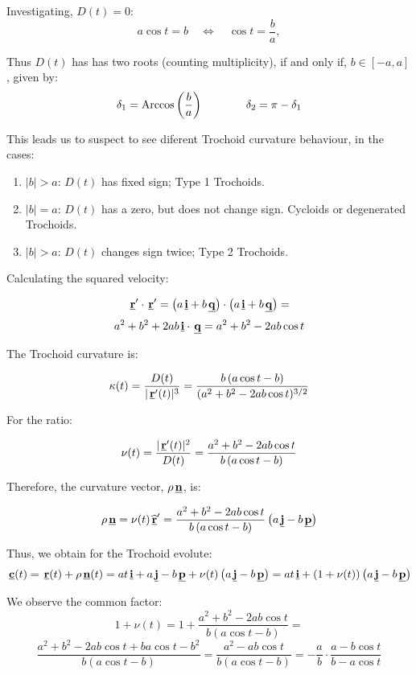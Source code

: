 Investigating, $D(t)=0$:
\[
 a \cos{t}
 =
 b
 \quad \Leftrightarrow \quad
 \cos{t}
 =
 \frac{b}{a},
\]

Thus $D(t)$ has has two roots (counting multiplicity), if and only
if, $b \in [-a,a]$, given by:
\[
 \delta_1 = \operatorname{Arccos}{ \left( \frac{b}{a} \right) }
 \qquad \qquad
 \delta_2 = \pi-\delta_1
\]

This leads us to suspect to see diferent Trochoid curvature behaviour, 
in the cases: 

\begin{enumerate}
 \item $|b|>a$: $D(t)$ has fixed sign; Type 1 Trochoids.
 \item $|b|=a$: $D(t)$ has a zero, but does not change sign. 
 Cycloids or degenerated Trochoids.
 \item $|b|>a$: $D(t)$ changes sign twice; Type 2 Trochoids.
\end{enumerate}

Calculating the squared velocity:

\[
 \hspace{0.05cm} \underline{\mathbf{ r }}' \cdot \hspace{0.05cm} \underline{\mathbf{ r }}'
 =
 \left(
    a \hspace{0.05cm} \underline{\mathbf{i}}
    +
    b \hspace{0.05cm} \underline{\mathbf{q}}
  \right)
  \cdot
  \left(
    a \hspace{0.05cm} \underline{\mathbf{i}}
    +
    b \hspace{0.05cm} \underline{\mathbf{q}}
  \right)
  =
\]
\[
 a^2+b^2
 +2ab \hspace{0.05cm} \underline{\mathbf{i}} \cdot \hspace{0.05cm} \underline{\mathbf{q}}
 =
 a^2+b^2-2ab \cos{t}
\]

The Trochoid curvature is:

\[
 \kappa(t)
 =
 \frac{D(t)}{ |\hspace{0.05cm} \underline{\mathbf{r}}'(t)|^3}
 =
 \frac{ b \left(
   a \cos{t}-b
 \right)
 }
 {
 (a^2+b^2-2ab \cos{t})^{3/2}
 }
\]

For the ratio:

\[
 \nu(t)
 =
 \frac{ |\hspace{0.05cm} \underline{\mathbf{r}}'(t)|^2}{D(t)}
 =
 \frac{ 
    a^2+b^2-2ab \cos{t}
 }
 {
   b \left(
   a \cos{t}-b
 \right)
 }
\]

Therefore, the curvature vector, $\rho \hspace{0.05cm} \underline{\mathbf{n}}$, is:

\[
 \rho \hspace{0.05cm} \underline{\mathbf{n}}
 =
 \nu(t) \hspace{0.05cm} \underline{\mathbf{ \widehat{r} }}'
 =
 \frac{ 
    a^2+b^2-2ab \cos{t}
 }
 {
   b \left(
   a \cos{t}-b
 \right)
 }
 \left(
    a \hspace{0.05cm} \underline{\mathbf{j}}
    -
    b \hspace{0.05cm} \underline{\mathbf{p}}
 \right)
\]

Thus, we obtain for the Trochoid evolute:
\[
 \hspace{0.05cm} \underline{\mathbf{c}}(t)
 =
 \hspace{0.05cm} \underline{\mathbf{r}}(t)+\rho \hspace{0.05cm} \underline{\mathbf{n}}(t)
 =
 at\hspace{0.05cm} \underline{\mathbf{i}}+a\hspace{0.05cm} \underline{\mathbf{j}}
  -b \hspace{0.05cm} \underline{\mathbf{p}}
  +
 \nu(t)
 \left(
    a \hspace{0.05cm} \underline{\mathbf{j}}
    -
    b \hspace{0.05cm} \underline{\mathbf{p}}
 \right)
 =
  at\hspace{0.05cm} \underline{\mathbf{i}}
  +
  (1+\nu(t))
  \left(
    a \hspace{0.05cm} \underline{\mathbf{j}}
    -
    b \hspace{0.05cm} \underline{\mathbf{p}}
 \right)
\]

We observe the common factor:
\[
 1+\nu(t)
 =
 1+
 \frac{ 
    a^2+b^2-2ab \cos{t}
 }
 {
   b \left(
   a \cos{t}-b
 \right)
 }
 =
 \]
 \[
\frac{ 
    a^2+b^2-2ab \cos{t}+ba \cos{t}-b^2
 }
 {
   b \left(
   a \cos{t}-b
 \right)
 }
 =
 \frac{ 
    a^2-ab \cos{t}
 }
 {
   b \left(
   a \cos{t}-b
 \right)
 }
 =
 -\frac{a}{b}
 \cdot
 \frac{ 
    a-b \cos{t}
 }
 {
   b-a \cos{t}
 }
\]

